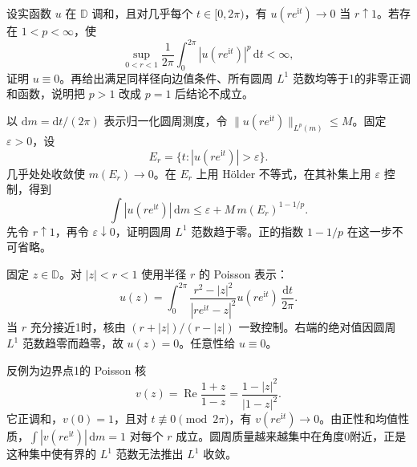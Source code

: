 \begin{exercise}[几乎处处边值何时能够确定调和函数]\label{b3:ex:15-draft-06}
设实函数 \(u\) 在 \(\mathbb D\) 调和，且对几乎每个 \(t\in[0,2\pi)\)，有 \(u(re^{\mathrm it})\to0\) 当 \(r\uparrow1\)。若存在 \(1<p<\infty\)，使
\[
 \sup_{0<r<1}\frac1{2\pi}\int_0^{2\pi}|u(re^{\mathrm it})|^p\,\mathrm dt<\infty,
\]
证明 \(u\equiv0\)。再给出满足同样径向边值条件、所有圆周 \(L^1\) 范数均等于1的非零正调和函数，说明把 \(p>1\) 改成 \(p=1\) 后结论不成立。
\end{exercise}
\begin{solution}
以 \(\mathrm dm=\mathrm dt/(2\pi)\) 表示归一化圆周测度，令 \(\|u(re^{\mathrm it})\|_{L^p(m)}\le M\)。固定 \(\varepsilon>0\)，设
\[
 E_r=\{t:|u(re^{\mathrm it})|>\varepsilon\}.
\]
几乎处处收敛使 \(m(E_r)\to0\)。在 \(E_r\) 上用 Hölder 不等式，在其补集上用 \(\varepsilon\) 控制，得到
\[
 \int|u(re^{\mathrm it})|\,\mathrm dm
 \le\varepsilon+M\,m(E_r)^{1-1/p}.
\]
先令 \(r\uparrow1\)，再令 \(\varepsilon\downarrow0\)，证明圆周 \(L^1\) 范数趋于零。正的指数 \(1-1/p\) 在这一步不可省略。

固定 \(z\in\mathbb D\)。对 \(|z|<r<1\) 使用半径 \(r\) 的 Poisson 表示：
\[
 u(z)=\int_0^{2\pi}
       \frac{r^2-|z|^2}{|re^{\mathrm it}-z|^2}
       u(re^{\mathrm it})\,\frac{\mathrm dt}{2\pi}.
\]
当 \(r\) 充分接近1时，核由 \((r+|z|)/(r-|z|)\) 一致控制。右端的绝对值因圆周 \(L^1\) 范数趋零而趋零，故 \(u(z)=0\)。任意性给 \(u\equiv0\)。

反例为边界点1的 Poisson 核
\[
 v(z)=\operatorname{Re}\frac{1+z}{1-z}
     =\frac{1-|z|^2}{|1-z|^2}.
\]
它正调和，\(v(0)=1\)，且对 \(t\not\equiv0\pmod{2\pi}\)，有 \(v(re^{\mathrm it})\to0\)。由正性和均值性质，\(\int|v(re^{\mathrm it})|\,\mathrm dm=1\) 对每个 \(r\) 成立。圆周质量越来越集中在角度0附近，正是这种集中使有界的 \(L^1\) 范数无法推出 \(L^1\) 收敛。
\end{solution}

